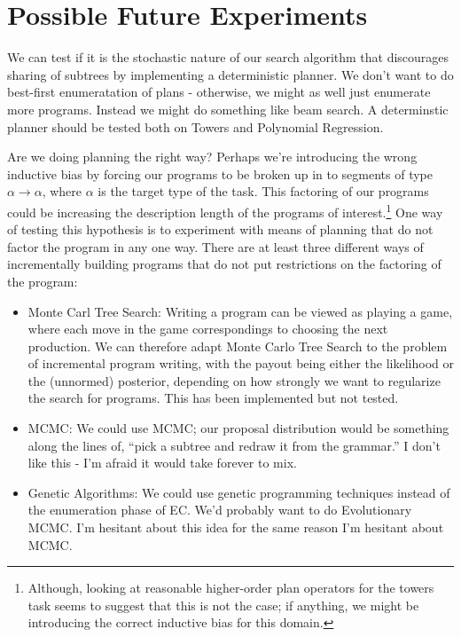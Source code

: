 \documentclass{article}
\begin{document}
\section{Possible Future Experiments}
 We can test if it is the stochastic nature of our search algorithm that discourages sharing of subtrees by implementing a deterministic planner.
 We don't want to do best-first enumeratation of plans - otherwise, we might as well just enumerate more programs.
Instead we might do something like beam search.
A determinstic planner should be tested both on Towers and Polynomial Regression.

Are we doing planning the right way? Perhaps we're introducing the wrong inductive bias by forcing our programs to be broken up in to segments of type $\alpha\to\alpha$, where $\alpha$  is the target type of the task. This factoring of our programs could be increasing the description length of the programs of interest.\footnote{Although, looking at reasonable higher-order plan operators for the towers task seems to suggest that this is not the case; if anything, we might be introducing the correct inductive bias for this domain.}
One way of testing this hypothesis is to experiment with means of planning that do not factor the program in any one way.
There are at least three different ways of incrementally building programs that do not put restrictions on the factoring of the program:
\begin{itemize}
\item{Monte Carl Tree Search:} Writing a program can be viewed as playing a game, where each move in the game correspondings to choosing the next production.
We can therefore adapt Monte Carlo Tree Search to the problem of incremental program writing, with the payout being either the likelihood or the (unnormed) posterior, depending on how strongly we want to regularize the search for programs.
This has been implemented but not tested.
\item{MCMC:} We could use MCMC; our proposal distribution would be something along the lines of, ``pick a subtree and redraw it from the grammar.'' I don't like this - I'm afraid it would take forever to mix.
\item{Genetic Algorithms:} We could use genetic programming techniques instead of the enumeration phase of EC. We'd probably want to do Evolutionary MCMC. I'm hesitant about this idea for the same reason I'm hesitant about MCMC.
\end{itemize}
\end{document}
